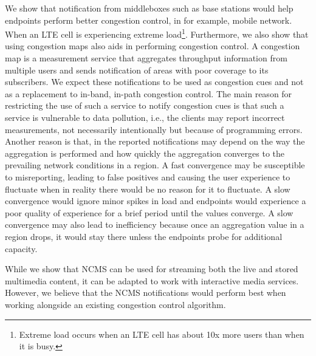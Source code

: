 We show that notification from middleboxes such as base stations would
help endpoints perform better congestion control, in for example, mobile network. 
When an LTE cell is experiencing extreme load\footnote{Extreme load
occurs when an LTE cell has about 10x more users than when it is busy.}.
Furthermore, we also show that using congestion maps also aids in performing
congestion control. A congestion map is a measurement service that aggregates
throughput information from multiple users and sends notification of areas
with poor coverage to its subscribers. We expect these notifications to be
used as congestion cues and not as a replacement to in-band, in-path
congestion control. The main reason for restricting the use of such a service
to notify congestion cues is that such a service is vulnerable to data
pollution, i.e., the clients may report incorrect measurements, not
necessarily intentionally but because of programming errors. Another reason is
that, in the reported notifications may depend on the way the aggregation is
performed and how quickly the aggregation converges to the prevailing network
conditions in a region. A fast convergence may be susceptible to misreporting,
leading to false positives and causing the user experience to fluctuate when in
reality there would be no reason for it to fluctuate. A slow convergence would
ignore minor spikes in load and endpoints would experience a poor quality of
experience for a brief period until the values converge. A slow convergence
may also lead to inefficiency because once an aggregation value in a region
drops, it would stay there unless the endpoints probe for additional capacity.

While we show that NCMS can be used for streaming both the live and stored
multimedia content, it can be adapted to work with interactive media services.
However, we believe that the NCMS notifications would perform best when
working alongside an existing congestion control algorithm.
